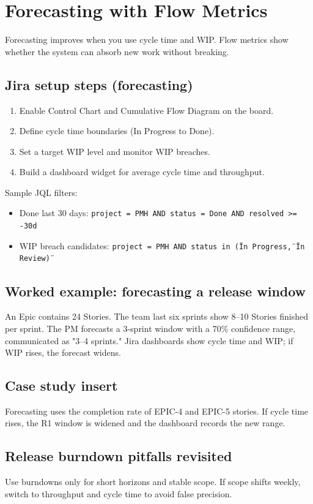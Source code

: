 \section{Forecasting with Flow Metrics}
Forecasting improves when you use cycle time and WIP. Flow metrics show whether the system can absorb new work without breaking.

\subsection{Jira setup steps (forecasting)}
\begin{enumerate}
  \item Enable Control Chart and Cumulative Flow Diagram on the board.
  \item Define cycle time boundaries (In Progress to Done).
  \item Set a target WIP level and monitor WIP breaches.
  \item Build a dashboard widget for average cycle time and throughput.
\end{enumerate}

Sample JQL filters:
\begin{itemize}
  \item Done last 30 days: \texttt{project = PMH AND status = Done AND resolved >= -30d}
  \item WIP breach candidates: \texttt{project = PMH AND status in (\"In Progress\", \"In Review\")}
\end{itemize}

\subsection{Worked example: forecasting a release window}
An Epic contains 24 Stories. The team last six sprints show 8–10 Stories finished per sprint. The PM forecasts a 3-sprint window with a 70\% confidence range, communicated as "3–4 sprints." Jira dashboards show cycle time and WIP; if WIP rises, the forecast widens.

\subsection{Case study insert}
Forecasting uses the completion rate of EPIC-4 and EPIC-5 stories. If cycle time rises, the R1 window is widened and the dashboard records the new range.
\subsection{Release burndown pitfalls revisited}
Use burndowns only for short horizons and stable scope. If scope shifts weekly, switch to throughput and cycle time to avoid false precision.










